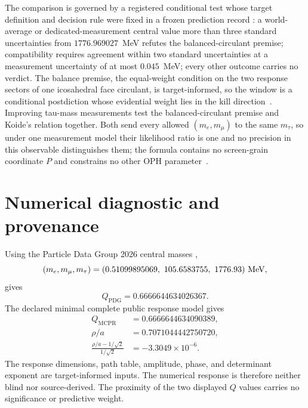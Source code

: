 \documentclass[11pt]{article}
\theoremstyle{remark}
\begin{document}
The comparison is governed by a registered conditional test whose target
definition and decision rule were fixed in a frozen prediction record
\cite{ophregister}: a world-average or dedicated-measurement central value
more than three standard uncertainties from \(1776.969027\)~MeV refutes
the balanced-circulant premise; compatibility requires agreement within
two standard uncertainties at a measurement uncertainty of at most
\(0.045\)~MeV; every other outcome carries no verdict. The balance
premise, the equal-weight condition on the two response sectors of one
icosahedral face circulant, is target-informed, so the window is a
conditional postdiction whose evidential weight lies in the kill
direction~\cite{ophregister,ophtaucomparison}. Improving tau-mass
measurements test the balanced-circulant premise and Koide's relation
together. Both send every allowed \((m_e,m_\mu)\) to the same \(m_\tau\), so
under one measurement model their likelihood ratio is one and no precision in
this observable distinguishes them; the formula contains no screen-grain
coordinate \(P\) and constrains no other OPH parameter~\cite{ophtaucomparison}.

\section{Numerical diagnostic and provenance}

Using the Particle Data Group 2026 central masses
\cite{pdg2026},
\[
(m_e,m_\mu,m_\tau)
=(0.51099895069,\ 105.6583755,\ 1776.93)\ {\rm MeV},
\]
gives
\[
Q_{\mathrm{PDG}}=0.6666644634026367.
\]
The declared minimal complete public response model gives
\[
\begin{aligned}
Q_{\mathrm{MCPR}}&=0.6666644634090389,\\
\rho/a&=0.7071044442750720,\\
\frac{\rho/a-1/\sqrt2}{1/\sqrt2}
&=-3.3049\times10^{-6}.
\end{aligned}
\]
The response dimensions, path table, amplitude, phase, and determinant
exponent are target-informed inputs. The numerical response is therefore
neither blind nor source-derived. The proximity of the two displayed \(Q\)
values carries no significance or predictive weight.
\end{document}
